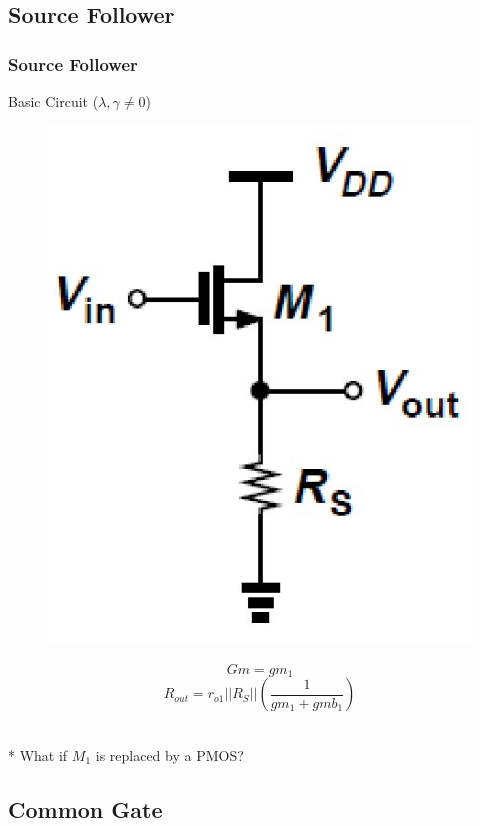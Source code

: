 \documentclass{beamer}
\begin{document}
\subsection{Source Follower}
\begin{frame}
    \frametitle{Source Follower}
    \begin{minipage}{0.45\linewidth}
        Basic Circuit ($\lambda, \gamma\not= 0$)
        \begin{figure}[H]
            \centering
            \includegraphics[width=0.8\linewidth]{source-follower-R.png}
        \end{figure}
         
    \end{minipage}
    \begin{minipage}{0.5\linewidth}
        \begin{equation*}
            Gm = gm_1 
        \end{equation*}
        \begin{equation*}
                R_{out} = r_{o1}||R_S||(\frac{1}{gm_1+gmb_1})
        \end{equation*}
    \end{minipage}\\
    * What if $M_1$ is replaced by a PMOS?%
\end{frame}
\subsection{Common Gate}
\end{document}
